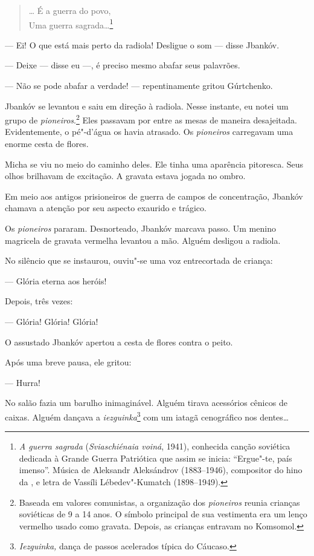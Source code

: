 \begin{verse}
\ldots{} É a guerra do povo,\\
Uma guerra sagrada\ldots{}\footnote{\emph{A guerra sagrada}
  (\emph{Sviaschiénaia voiná}, 1941), conhecida canção soviética
  dedicada à Grande Guerra Patriótica que assim se inicia: ``Ergue"-te,
  país imenso''. Música de Aleksandr Aleksándrov (1883--1946),
  compositor do hino da , e letra de Vassíli Lébedev"-Kumatch
  (1898--1949).}
\end{verse}

--- Ei! O que está mais perto da radiola! Desligue o som --- disse
Jbankóv.

--- Deixe --- disse eu ---, é preciso mesmo abafar seus palavrões.

--- Não se pode abafar a verdade! --- repentinamente gritou Gúrtchenko.

Jbankóv se levantou e saiu em direção à radiola. Nesse instante, eu
notei um grupo de \emph{pioneiros}.\footnote{Baseada em valores
  comunistas, a organização dos \emph{pioneiros} reunia crianças
  soviéticas de 9 a 14 anos. O símbolo principal de sua vestimenta era
  um lenço vermelho usado como gravata. Depois, as crianças entravam no
  Komsomol.} Eles passavam por entre as mesas de maneira desajeitada.
Evidentemente, o pé"-d'água os havia atrasado. Os \emph{pioneiros}
carregavam uma enorme cesta de flores.

Micha se viu no meio do caminho deles. Ele tinha uma aparência
pitoresca. Seus olhos brilhavam de excitação. A gravata estava jogada no
ombro.

Em meio aos antigos prisioneiros de guerra de campos de concentração,
Jbankóv chamava a atenção por seu aspecto exaurido e trágico.

Os \emph{pioneiros} pararam. Desnorteado, Jbankóv marcava passo. Um
menino magricela de gravata vermelha levantou a mão. Alguém desligou a
radiola.

No silêncio que se instaurou, ouviu"-se uma voz entrecortada de criança:

--- Glória eterna aos heróis!

Depois, três vezes:

--- Glória! Glória! Glória!

O assustado Jbankóv apertou a cesta de flores contra o peito.

Após uma breve pausa, ele gritou:

--- Hurra!

No salão fazia um barulho inimaginável. Alguém tirava acessórios cênicos
de caixas. Alguém dançava a \emph{iezguinka}\footnote{\emph{Iezguinka,}
  dança de passos acelerados típica do Cáucaso.} com um iatagã
cenográfico nos dentes\ldots{}


